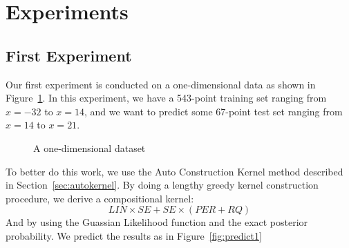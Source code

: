 \section{Experiments} \label{sec:experiment}


\subsection{First Experiment}
Our first experiment is conducted on a one-dimensional data as shown in Figure~\ref{fig:data1}. In this experiment, we have a 543-point training set ranging from $x = -32$ to $x = 14$, and we want to predict some 67-point test set ranging from $x = 14$ to $x = 21$.

\begin{figure}[htp]
\begin{minipage}[htp]{1\linewidth}
	\centering
\caption{A one-dimensional dataset}
\label{fig:data1} %
\end{minipage}
\vspace{-0.05in}
\end{figure}

To better do this work, we use the Auto Construction Kernel method described in Section~\ref{sec:autokernel}.
By doing a lengthy greedy kernel construction procedure, we derive a compositional kernel:
\begin{equation}
LIN \times SE + SE \times ( PER + RQ )
\end{equation}
And by using the Guassian Likelihood function and the exact posterior probability.
We predict the results as in Figure~\ref{fig:predict1}

